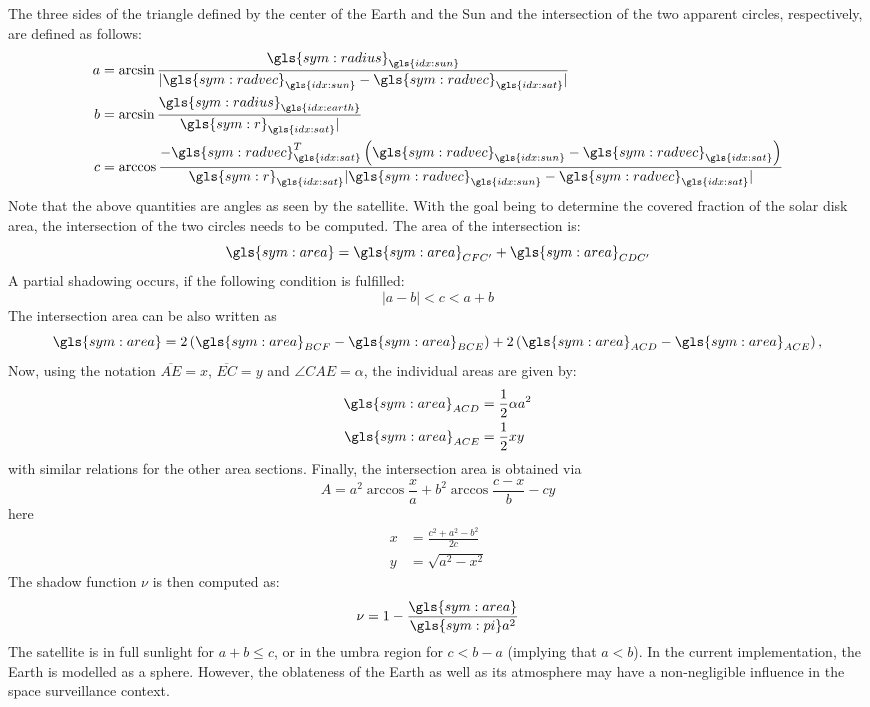 The three sides of the triangle defined by the center of the Earth and the Sun and the intersection of the two apparent circles, respectively, are defined as follows:
 \begin{align}
  a &= \arcsin \frac{\gls{sym:radius}_{\gls{idx:sun}}}{|\gls{sym:radvec}_{\gls{idx:sun}}-\gls{sym:radvec}_{\gls{idx:sat}}|} \\
  b &= \arcsin \frac{\gls{sym:radius}_{\gls{idx:earth}}}{\gls{sym:r}_{\gls{idx:sat}}|} \\
  c &= \arccos
\frac{-\gls{sym:radvec}_{\gls{idx:sat}}^T\left(\gls{sym:radvec}_{\gls{idx:sun}}-\gls{sym:radvec}_{\gls{idx:sat}}\right)}{\gls{sym:r}_{\gls{idx:sat}}|\gls{sym:radvec}_{
\gls{idx:sun}}-\gls{sym:radvec}_{\gls{idx:sat}}|}
 \end{align}
 Note that the above quantities are angles as seen by the satellite. With the goal being to determine the covered fraction of the solar disk area, the intersection of the two
circles needs to be computed. The area of the intersection is: 
 \begin{equation}
  \gls{sym:area} = \gls{sym:area}_{CFC'} + \gls{sym:area}_{CDC'}
 \end{equation}
A partial shadowing occurs, if the following condition is fulfilled:
  \begin{equation}
   |a-b|<c<a+b
  \end{equation}
The intersection area can be also written as
\begin{equation}
  \gls{sym:area} = 2\left(\gls{sym:area}_{BCF} - \gls{sym:area}_{BCE}\right)+2\left(\gls{sym:area}_{ACD} - \gls{sym:area}_{ACE}\right),
 \end{equation}
Now, using the notation $\overline{AE}=x$, $\overline{EC}=y$ and $\angle CAE=\alpha$, the individual areas are given by:
\begin{align}
 \gls{sym:area}_{ACD} &=\frac{1}{2}\alpha a^2 \\
 \gls{sym:area}_{ACE} &=\frac{1}{2} x y 
\end{align}
with similar relations for the other area sections. Finally, the intersection area is obtained via
\begin{equation}
 A = a^2 \arccos\frac{x}{a} + b^2\arccos \frac{c-x}{b}-cy
\end{equation}
here
\begin{align}
 x &= \frac{c^2+a^2-b^2}{2c} \\
 y &= \sqrt{a^2-x^2}
\end{align}
The shadow function $\nu$ is then computed as:
\begin{equation}
 \nu = 1-\frac{\gls{sym:area}}{\gls{sym:pi}a^2}
\end{equation}
The satellite is in full sunlight for $a+b\leq c$, or in the umbra region for $c<b-a$ (implying that $a<b$). In the current implementation, the Earth is modelled as a sphere.
However, the oblateness of the Earth as well as its atmosphere may have a non-negligible influence in the space surveillance context.

